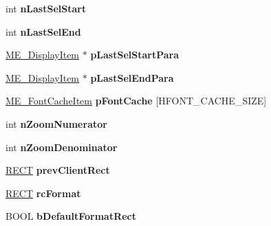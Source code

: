 \begin{DoxyCompactItemize}
int {\bfseries n\+Last\+Sel\+Start}
\item 
\mbox{\label{structtag_m_e___text_editor_a7d5c2cd1d91169a71a3d0f5c9c26aec3}} 
int {\bfseries n\+Last\+Sel\+End}
\item 
\mbox{\label{structtag_m_e___text_editor_a3d9a65b6c0ed5071e686cd427149cd19}} 
\hyperlink{structtag_m_e___display_item}{M\+E\+\_\+\+Display\+Item} $\ast$ {\bfseries p\+Last\+Sel\+Start\+Para}
\item 
\mbox{\label{structtag_m_e___text_editor_a362f4235d6b532428c869d811716d67c}} 
\hyperlink{structtag_m_e___display_item}{M\+E\+\_\+\+Display\+Item} $\ast$ {\bfseries p\+Last\+Sel\+End\+Para}
\item 
\mbox{\label{structtag_m_e___text_editor_a189117901f80cb502668649cbeaf9e83}} 
\hyperlink{structtag_m_e___font_cache_item}{M\+E\+\_\+\+Font\+Cache\+Item} {\bfseries p\+Font\+Cache} \mbox{[}H\+F\+O\+N\+T\+\_\+\+C\+A\+C\+H\+E\+\_\+\+S\+I\+ZE\mbox{]}
\item 
\mbox{\label{structtag_m_e___text_editor_a2a612072ec831ee20b84bc75ec531db3}} 
int {\bfseries n\+Zoom\+Numerator}
\item 
\mbox{\label{structtag_m_e___text_editor_ab7d0db79cf0c53e15b36244ba2c94701}} 
int {\bfseries n\+Zoom\+Denominator}
\item 
\mbox{\label{structtag_m_e___text_editor_a73af88f64d94218a54ef2060db00ca70}} 
\hyperlink{structtag_r_e_c_t}{R\+E\+CT} {\bfseries prev\+Client\+Rect}
\item 
\mbox{\label{structtag_m_e___text_editor_a45c43c7b7120b73d9e36858d1e589786}} 
\hyperlink{structtag_r_e_c_t}{R\+E\+CT} {\bfseries rc\+Format}
\item 
\mbox{\label{structtag_m_e___text_editor_a2b4b7c6f3d50fe8e579f04ed61f57efd}} 
B\+O\+OL {\bfseries b\+Default\+Format\+Rect}
\item 
\mbox{\label{structtag_m_e___text_editor_ab75593168a980e1a2b6bb5e4254e53c0}} 

\end{DoxyCompactItemize}
